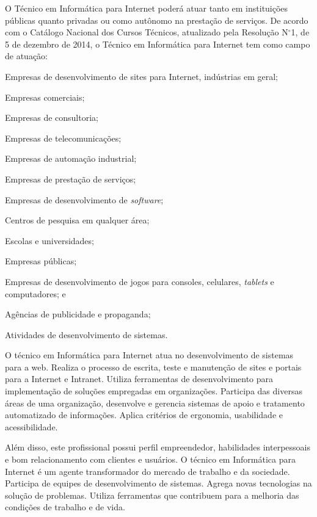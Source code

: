 \documentclass[
	12pt,				%
	openright,			%
	twoside,			%
	a4paper,			%
	chapter=TITLE,		%
	english,			%
	french,				%
	spanish,			%
	brazil,				%
	]{abntex2}
\begin{document}
O Técnico em Informática para Internet poderá atuar tanto em instituições públicas quanto privadas ou como autônomo na prestação de serviços. De acordo com o Catálogo Nacional dos Cursos Técnicos, atualizado pela Resolução N$^\circ$1, de 5 de dezembro de 2014, o Técnico em Informática para Internet tem como campo de atuação:
\begin{alineas}
    \item Empresas de desenvolvimento de sites para Internet, indústrias em geral;
    \item Empresas comerciais;
    \item Empresas de consultoria;
    \item Empresas de telecomunicações;
    \item Empresas de automação industrial;
    \item Empresas de prestação de serviços;
    \item Empresas de desenvolvimento de \textit{software};
    \item Centros de pesquisa em qualquer área;
    \item Escolas e universidades;
    \item Empresas públicas;
    \item Empresas de desenvolvimento de jogos para consoles, celulares, \textit{tablets} e computadores; e
    \item Agências de publicidade e propaganda;
    \item  Atividades de desenvolvimento de sistemas.
\end{alineas}


O técnico em Informática para Internet atua no desenvolvimento de sistemas para a web. Realiza o processo de escrita, teste e manutenção de sites e portais para a Internet e Intranet. Utiliza ferramentas de desenvolvimento para implementação de soluções empregadas em organizações. Participa das diversas áreas de uma organização, desenvolve e gerencia sistemas de apoio e tratamento automatizado de informações. Aplica critérios de ergonomia, usabilidade e acessibilidade.

Além disso, este profissional possui perfil empreendedor, habilidades interpessoais e bom relacionamento com clientes e usuários. O técnico em Informática para Internet é um agente transformador do mercado de trabalho e da sociedade. Participa de equipes de desenvolvimento de sistemas. Agrega novas tecnologias na solução de problemas. Utiliza ferramentas que contribuem para a melhoria das condições de trabalho e de vida.
\end{document}
